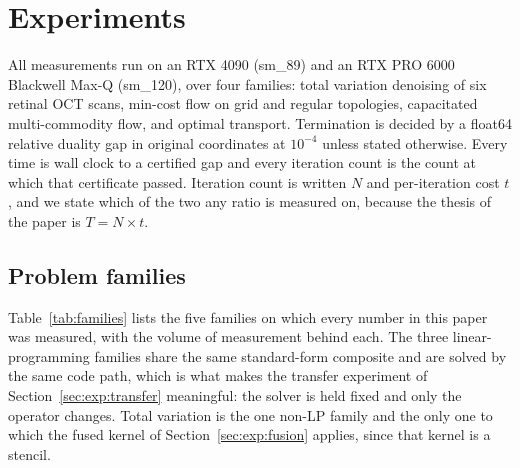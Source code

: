 
\section{Experiments}
\label{sec:results}
\label{sec:exp}

All measurements run on an RTX 4090 (sm\_89) and an RTX PRO 6000 Blackwell
Max-Q (sm\_120), over four families: total variation denoising of six retinal
OCT scans, min-cost flow on grid and regular topologies, capacitated
multi-commodity flow, and optimal transport. Termination is decided by a
float64 relative duality gap in original coordinates at $10^{-4}$ unless stated
otherwise. Every time is wall clock to a certified gap and every iteration
count is the count at which that certificate passed. Iteration count is written
$N$ and per-iteration cost $t$, and we state which of the two any ratio is
measured on, because the thesis of the paper is $T = N \times t$.

\subsection{Problem families}
\label{sec:families}

Table~\ref{tab:families} lists the five families on which every number in this
paper was measured, with the volume of measurement behind each. The three
linear-programming families share the same standard-form composite and are
solved by the same code path, which is what makes the transfer experiment of
Section~\ref{sec:exp:transfer} meaningful: the solver is held fixed and only the
operator changes. Total variation is the one non-LP family and the only one to
which the fused kernel of Section~\ref{sec:exp:fusion} applies, since that kernel is
a stencil.

